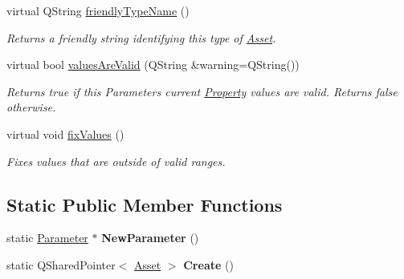 \begin{DoxyCompactItemize}
\item 
virtual Q\-String \hyperlink{class_picto_1_1_choice_parameter_aa2ad97d4bfaabfebab1b641e661efe18}{friendly\-Type\-Name} ()
\begin{DoxyCompactList}\small\item\em Returns a friendly string identifying this type of \hyperlink{class_picto_1_1_asset}{Asset}. \end{DoxyCompactList}\item 
virtual bool \hyperlink{class_picto_1_1_choice_parameter_af928dab27c206f9eccac7d99a1c5d3f4}{values\-Are\-Valid} (Q\-String \&warning=Q\-String())
\begin{DoxyCompactList}\small\item\em Returns true if this Parameters current \hyperlink{class_picto_1_1_property}{Property} values are valid. Returns false otherwise. \end{DoxyCompactList}\item 
virtual void \hyperlink{class_picto_1_1_choice_parameter_ae9deed2f21ce6f781244f8593b76f949}{fix\-Values} ()
\begin{DoxyCompactList}\small\item\em Fixes values that are outside of valid ranges. \end{DoxyCompactList}\end{DoxyCompactItemize}
\subsection*{Static Public Member Functions}
\begin{DoxyCompactItemize}
\item 
\hypertarget{class_picto_1_1_choice_parameter_a14bed28b0968bbfb3ae8460ef742ec7f}{static \hyperlink{class_picto_1_1_parameter}{Parameter} $\ast$ {\bfseries New\-Parameter} ()}\label{class_picto_1_1_choice_parameter_a14bed28b0968bbfb3ae8460ef742ec7f}

\item 
\hypertarget{class_picto_1_1_choice_parameter_acc4d411cda87c2e2b4d6655354c369c2}{static Q\-Shared\-Pointer$<$ \hyperlink{class_picto_1_1_asset}{Asset} $>$ {\bfseries Create} ()}\label{class_picto_1_1_choice_parameter_acc4d411cda87c2e2b4d6655354c369c2}

\end{DoxyCompactItemize}
